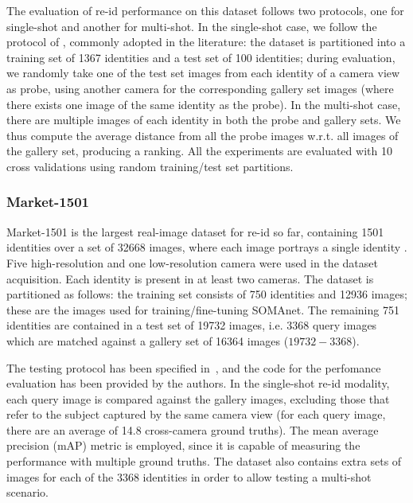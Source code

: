 \documentclass[10pt,journal,letterpaper,compsoc]{IEEEtran}
\begin{document}
The evaluation of re-id performance on this dataset follows two protocols, one for single-shot and another for multi-shot. In the single-shot case, we follow the protocol of  \cite{li2014deepreid}, commonly adopted in the literature: the dataset is partitioned into a training set of 1367 identities and a test set of 100 identities; during evaluation, we randomly take one of the test set images from each identity of a camera view as probe, using another camera for the corresponding gallery set images (where there exists one image of the same identity as the probe). In the multi-shot case, there are multiple images of each identity in both the probe and gallery sets. We thus compute the average distance from all the probe images w.r.t. all images of the gallery set, producing a ranking.  All the experiments are evaluated with 10 cross validations using random training/test set partitions.


\subsubsection{Market-1501}

Market-1501 is the largest real-image dataset for re-id so far, containing 1501 identities over a set of 32668 images, where each image portrays a single identity \cite{market}.
Five high-resolution and one low-resolution camera were used in the dataset acquisition. Each identity is present in at least two cameras. The dataset is partitioned as follows: the training set consists of 750 identities and 12936 images; these are the images used for training/fine-tuning SOMAnet. The remaining 751 identities are contained in a test set of 19732 images, i.e. 3368 query images which are matched against a gallery set of 16364 images ($19732-3368$).





The testing protocol has been specified in~\cite{market}, and the code for the perfomance evaluation has been provided by the authors. In the single-shot re-id modality, each query image is compared against the gallery images, excluding those that refer to the subject captured by the same camera view (for each query image, there are an average of 14.8 cross-camera ground truths). The mean average precision (mAP) metric is employed, since it is capable of measuring the performance with multiple ground truths.
The dataset also contains extra sets of images for each of the 3368 identities in order to allow testing a multi-shot scenario.
\end{document}
